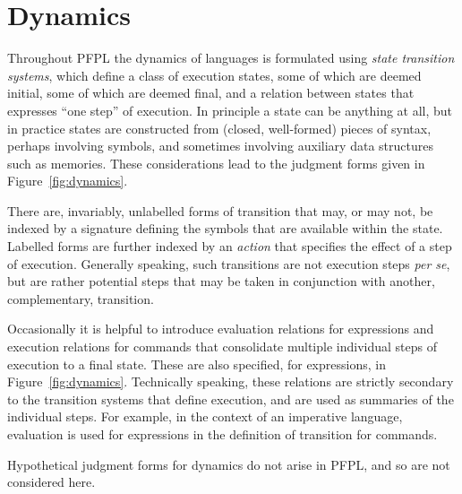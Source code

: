 \documentclass[11pt]{article}
\begin{document}
\section*{Dynamics}

Throughout \textsf{PFPL} the dynamics of languages is formulated using \emph{state transition systems}, which define a class of execution states, some of which are deemed initial, some of which are deemed final, and a relation between states that expresses ``one step'' of execution.  In principle a state can be anything at all, but in practice states are constructed from (closed, well-formed) pieces of syntax, perhaps involving symbols, and sometimes involving auxiliary data structures such as memories.  These considerations lead to the judgment forms given in Figure~\ref{fig:dynamics}.

There are, invariably, unlabelled forms of transition that may, or may not, be indexed by a signature defining the symbols that are available within the state.  Labelled forms are further indexed by an \emph{action} that specifies the effect of a step of execution.  Generally speaking, such transitions are not execution steps \textit{per se}, but are rather potential steps that may be taken in conjunction with another, complementary, transition.

\smallskip

Occasionally it is helpful to introduce evaluation relations for expressions and execution relations for commands that consolidate multiple individual steps of execution to a final state.  These are also specified, for expressions, in Figure~\ref{fig:dynamics}.  Technically speaking, these relations are strictly secondary to the transition systems that define execution, and are used as summaries of the individual steps.  For example, in the context of an imperative language, evaluation is used for expressions in the definition of transition for commands.

\smallskip

Hypothetical judgment forms for dynamics do not arise in \textsf{PFPL}, and so are not considered here.
\end{document}
